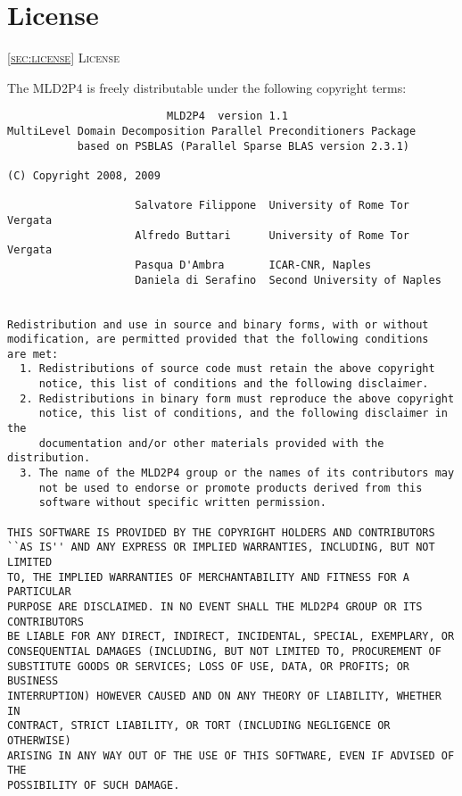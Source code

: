 \section{License\label{sec:license}}
         {\textsc{\ref{sec:license} License}}

The MLD2P4 is freely distributable under the following copyright
terms: {\small
\begin{verbatim} 
                         MLD2P4  version 1.1
MultiLevel Domain Decomposition Parallel Preconditioners Package
           based on PSBLAS (Parallel Sparse BLAS version 2.3.1)

(C) Copyright 2008, 2009

                    Salvatore Filippone  University of Rome Tor Vergata       
                    Alfredo Buttari      University of Rome Tor Vergata
                    Pasqua D'Ambra       ICAR-CNR, Naples
                    Daniela di Serafino  Second University of Naples


Redistribution and use in source and binary forms, with or without
modification, are permitted provided that the following conditions
are met:
  1. Redistributions of source code must retain the above copyright
     notice, this list of conditions and the following disclaimer.
  2. Redistributions in binary form must reproduce the above copyright
     notice, this list of conditions, and the following disclaimer in the
     documentation and/or other materials provided with the distribution.
  3. The name of the MLD2P4 group or the names of its contributors may
     not be used to endorse or promote products derived from this
     software without specific written permission.

THIS SOFTWARE IS PROVIDED BY THE COPYRIGHT HOLDERS AND CONTRIBUTORS
``AS IS'' AND ANY EXPRESS OR IMPLIED WARRANTIES, INCLUDING, BUT NOT LIMITED
TO, THE IMPLIED WARRANTIES OF MERCHANTABILITY AND FITNESS FOR A PARTICULAR
PURPOSE ARE DISCLAIMED. IN NO EVENT SHALL THE MLD2P4 GROUP OR ITS CONTRIBUTORS
BE LIABLE FOR ANY DIRECT, INDIRECT, INCIDENTAL, SPECIAL, EXEMPLARY, OR
CONSEQUENTIAL DAMAGES (INCLUDING, BUT NOT LIMITED TO, PROCUREMENT OF
SUBSTITUTE GOODS OR SERVICES; LOSS OF USE, DATA, OR PROFITS; OR BUSINESS
INTERRUPTION) HOWEVER CAUSED AND ON ANY THEORY OF LIABILITY, WHETHER IN
CONTRACT, STRICT LIABILITY, OR TORT (INCLUDING NEGLIGENCE OR OTHERWISE)
ARISING IN ANY WAY OUT OF THE USE OF THIS SOFTWARE, EVEN IF ADVISED OF THE
POSSIBILITY OF SUCH DAMAGE.
\end{verbatim}
}
